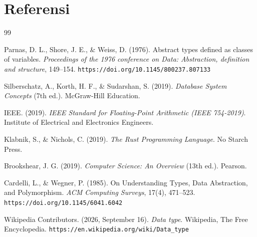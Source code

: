 \documentclass[11pt,a4paper]{article}
\begin{document}
	\newpage
	\section*{Referensi}
	
	\begin{thebibliography}{99}
		
		Parnas, D. L., Shore, J. E., \& Weiss, D. (1976).
		Abstract types defined as classes of variables.
		\textit{Proceedings of the 1976 conference on Data: Abstraction, definition and structure}, 149--154.
		\texttt{https://doi.org/10.1145/800237.807133}
		
		Silberschatz, A., Korth, H. F., \& Sudarshan, S. (2019).
		\textit{Database System Concepts} (7th ed.).
		McGraw-Hill Education.
		
		IEEE. (2019).
		\textit{IEEE Standard for Floating-Point Arithmetic
			(IEEE 754-2019)}.
		Institute of Electrical and Electronics Engineers.
		
		Klabnik, S., \& Nichols, C. (2019).
		\textit{The Rust Programming Language}.
		No Starch Press.
		
		Brookshear, J. G. (2019).
		\textit{Computer Science: An Overview} (13th ed.).
		Pearson.
		
		Cardelli, L., \& Wegner, P. (1985).
		On Understanding Types, Data Abstraction, and Polymorphism.
		\textit{ACM Computing Surveys}, 17(4), 471--523.
		\texttt{https://doi.org/10.1145/6041.6042}
		
		Wikipedia Contributors. (2026, September 16).
		\textit{Data type}.
		Wikipedia, The Free Encyclopedia.
		\texttt{https://en.wikipedia.org/wiki/Data\_type}
		
	\end{thebibliography}
	
\end{document}
